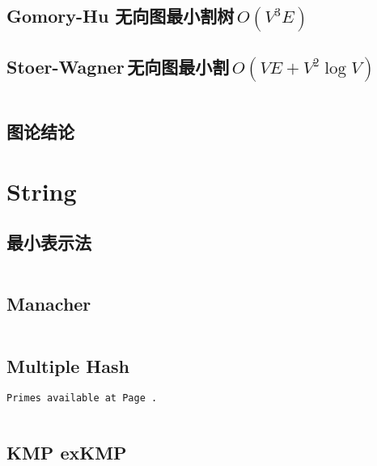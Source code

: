 \documentclass[titlepage, a4paper]{article}
\begin{document}
\begin{multicols}{2}
\begin{spacing}{0.6}
				\subsection{Gomory-Hu 无向图最小割树\,$O(V ^ 3 E)$}
				
				\subsection{Stoer-Wagner\,无向图最小割\,$O(VE + V ^ 2 \log V)$}
				\inputminted{cpp}{src/yzh/Stoer-Wagner.cpp}
				
				\subsection{图论结论}
				
				
				
				
				
			
			\section{String}
				\subsection{最小表示法}
				\inputminted{cpp}{src/String/最小表示法.cpp}
				\subsection{Manacher}
				\inputminted{cpp}{src/String/Manacher.cpp}
				\subsection{Multiple Hash}
				{\tt \small Primes available at Page \pageref{randomprimes}.}
				\inputminted{cpp}{src/String/hash.cpp}	
				\subsection{KMP exKMP}
				\inputminted{cpp}{src/String/KMP.cpp}

\end{spacing}
\end{multicols}
\end{document}
